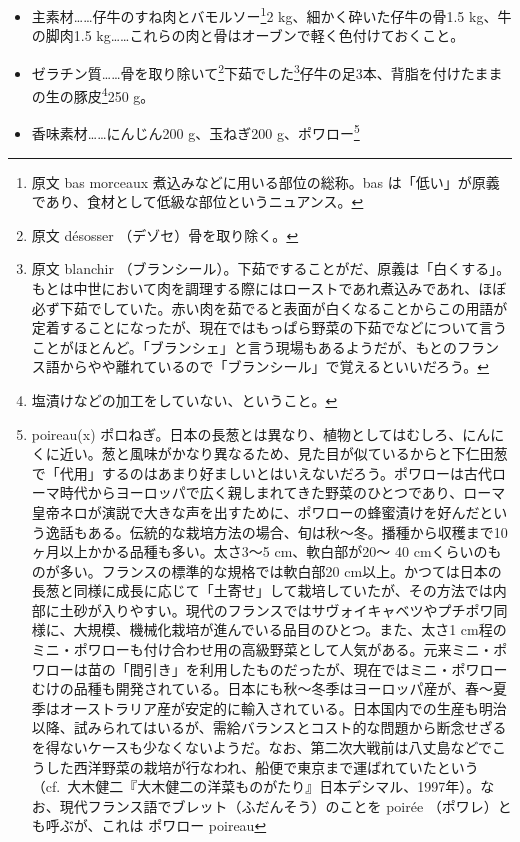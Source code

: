 \begin{recette}
\begin{itemize}
\item
  主素材\ldots{}\ldots{}仔牛のすね肉とバモルソー\footnote{原文 bas
    morceaux 煮込みなどに用いる部位の総称。bas
    は「低い」が原義であり、食材として低級な部位というニュアンス。}2
  kg、細かく砕いた仔牛の骨1.5 kg、牛の脚肉1.5
  kg\ldots{}\ldots{}これらの肉と骨はオーブンで軽く色付けておくこと。
\item
  ゼラチン質\ldots{}\ldots{}骨を取り除いて\footnote{原文 désosser
    （デゾセ）骨を取り除く。}下茹でした\footnote{原文 blanchir
    （ブランシール）。下茹ですることがだ、原義は「白くする」。もとは中世において肉を調理する際にはローストであれ煮込みであれ、ほぼ必ず下茹でしていた。赤い肉を茹でると表面が白くなることからこの用語が定着することになったが、現在ではもっぱら野菜の下茹でなどについて言うことがほとんど。「ブランシェ」と言う現場もあるようだが、もとのフランス語からやや離れているので「ブランシール」で覚えるといいだろう。}仔牛の足3本、背脂を付けたままの生の豚皮\footnote{塩漬けなどの加工をしていない、ということ。}250
  g。
\item
  香味素材\ldots{}\ldots{}にんじん200 g、玉ねぎ200 g、ポワロー\footnote{poireau(x)
    ポロねぎ。日本の長葱とは異なり、植物としてはむしろ、にんにくに近い。葱と風味がかなり異なるため、見た目が似ているからと下仁田葱で「代用」するのはあまり好ましいとはいえないだろう。ポワローは古代ローマ時代からヨーロッパで広く親しまれてきた野菜のひとつであり、ローマ皇帝ネロが演説で大きな声を出すために、ポワローの蜂蜜漬けを好んだという逸話もある。伝統的な栽培方法の場合、旬は秋〜冬。播種から収穫まで10ヶ月以上かかる品種も多い。太さ3〜5
    cm、軟白部が20〜 40
    cmくらいのものが多い。フランスの標準的な規格では軟白部20
    cm以上。かつては日本の長葱と同様に成長に応じて「土寄せ」して栽培していたが、その方法では内部に土砂が入りやすい。現代のフランスではサヴォイキャベツやプチポワ同様に、大規模、機械化栽培が進んでいる品目のひとつ。また、太さ1
    cm程のミニ・ポワローも付け合わせ用の高級野菜として人気がある。元来ミニ・ポワローは苗の「間引き」を利用したものだったが、現在ではミニ・ポワローむけの品種も開発されている。日本にも秋〜冬季はヨーロッパ産が、春〜夏季はオーストラリア産が安定的に輸入されている。日本国内での生産も明治以降、試みられてはいるが、需給バランスとコスト的な問題から断念せざるを得ないケースも少なくないようだ。なお、第二次大戦前は八丈島などでこうした西洋野菜の栽培が行なわれ、船便で東京まで運ばれていたという（cf.~大木健二『大木健二の洋菜ものがたり』日本デシマル、1997年）。なお、現代フランス語でブレット（ふだんそう）のことを
    poirée （ポワレ）とも呼ぶが、これは ポワロー poireau
}
\end{itemize}
\end{recette}
